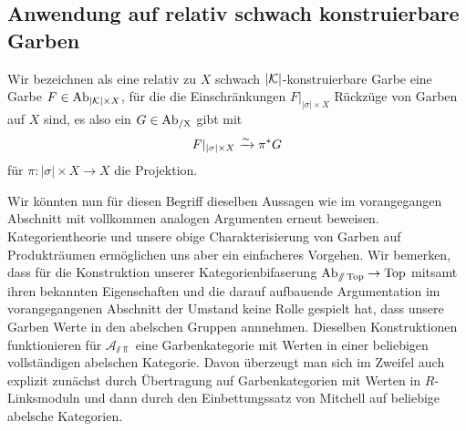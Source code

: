 \subsection{Anwendung auf relativ schwach konstruierbare Garben} 

Wir bezeichnen als eine relativ zu $X$ schwach $|\mathcal{K}|$-konstruierbare
Garbe eine Garbe $F \in \operatorname{Ab}_{|\mathcal{K}| \times X}$, für die die
Einschränkungen $F|_{|\sigma| \times X}$ Rückzüge von Garben auf $X$
sind, es also ein $G \in \operatorname{Ab_{/X}}$ gibt mit
\[ F|_{|\sigma| \times X} \xrightarrow[]{\sim} \pi^* G \]
für $\pi: |\sigma| \times X \to X$ die Projektion.

Wir könnten nun für diesen Begriff dieselben Aussagen wie im
vorangegangen Abschnitt mit vollkommen analogen Argumenten erneut
beweisen. Kategorientheorie und unsere obige Charakterisierung von
Garben auf Produkträumen ermöglichen uns aber ein einfacheres
Vorgehen. Wir bemerken, dass für die Konstruktion unserer
Kategorienbifaserung $\operatorname{Ab}_{\mathbin{/\mkern-6mu/} \operatorname{Top}} \to \operatorname{Top}$ mitsamt ihren
bekannten Eigenschaften und die darauf aufbauende Argumentation im
vorangegangenen Abschnitt der Umstand keine Rolle gespielt hat, dass
unsere Garben Werte in den abelschen Gruppen annnehmen. Dieselben
Konstruktionen funktionieren für $\mathcal{A}_{\sslash \Top}$ eine
Garbenkategorie mit Werten in einer beliebigen vollständigen abelschen
Kategorie. Davon überzeugt man sich im Zweifel auch explizit zunächst
durch Übertragung auf Garbenkategorien mit Werten in $R$-Linksmoduln
und dann durch den Einbettungssatz von Mitchell auf beliebige abelsche
Kategorien.

